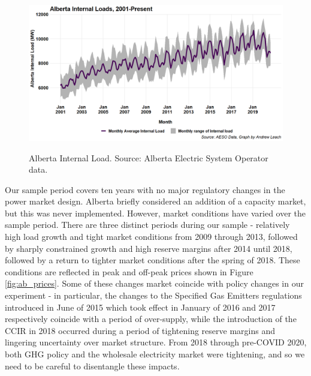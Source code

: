 \documentclass[12pt]{article}
\begin{document}
\begin{figure}[!h]%
	\centering \vspace{-.25cm} \includegraphics[width=6.5in]{../images/load_time.png}
\label{fig:ab_load}
\vspace{-0.75cm}	\caption{Alberta Internal Load. Source: Alberta Electric System Operator data.}
\end{figure}

Our sample period covers ten years with no major regulatory changes in the power market design. Alberta briefly considered an addition of a capacity market, but this was never implemented. However, market conditions have varied over the sample period. There are three distinct periods during our sample - relatively high load growth and tight market conditions from 2009 through 2013, followed by sharply constrained growth and high reserve margins after 2014 until 2018, followed by a return to tighter market conditions after the spring of 2018. These conditions are reflected in peak and off-peak prices shown in Figure \ref{fig:ab_prices}. Some of these changes market coincide with policy changes in our experiment - in particular, the changes to the Specified Gas Emitters regulations introduced in June of 2015 which took effect in January of 2016 and 2017 respectively coincide with a period of over-supply, while the introduction of the CCIR in 2018 occurred during a period of tightening reserve margins and lingering uncertainty over market structure. From 2018 through pre-COVID 2020, both GHG policy and the wholesale electricity market were tightening, and so we need to be careful to disentangle these impacts.
\end{document}

